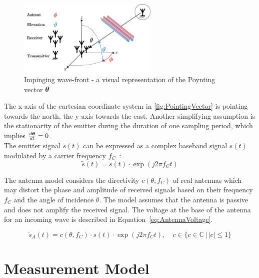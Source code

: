 \begin{figure}[H]
    \centering
    \includegraphics[width=0.6\textwidth]{figures/02_SignalModel/pointing_vect.drawio.pdf}
    \caption{Impinging wave-front - a visual representation of the Poynting vector \( \boldsymbol{\theta} \)}
    \label{fig:PointingVector}
\end{figure}
The x-axis of the cartesian coordinate system in \autoref{fig:PointingVector} is pointing towards the north, the
y-axis towards the east. Another simplifying assumption is the stationarity of the emitter during the duration of
one sampling period, which implies \( \frac{d\boldsymbol{\theta}}{dt} = 0 \).
\\

The emitter signal \( \widetilde{s}(t) \) can be expressed as a complex baseband signal \( s(t) \) modulated by a
carrier frequency \( f_C \)~\cite{tuncer.ch1}:
\begin{equation}
    \widetilde{s}(t) = s(t) \cdot \exp(j 2\pi f_C t)
    \label{eq:EmitterSignal}
\end{equation}


\label{sec:AntennaModel}
The antenna model considers the directivity \( c(\theta, f_C) \) of real antennas which may distort the phase and
amplitude of received signals based on their frequency \( f_C \) and the angle of incidence \( \theta \).
The model assumes that the antenna is passive and does not amplify the received signal.
The voltage at the base of the antenna for an incoming wave is described in Equation~\eqref{eq:AntennaVoltage}.

\begin{equation}
    \widetilde{s}_A(t) = c(\theta, f_C) \cdot s(t) \cdot \exp(j 2\pi f_C t), \quad c \in \{c \in \mathbb{C} \,|\, |c| \leq 1\}
    \label{eq:AntennaVoltage}
\end{equation}

\section{Measurement Model}
\label{sec:MeasurementModel}

